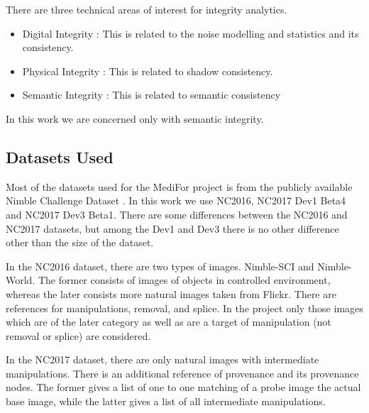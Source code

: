\documentclass{article}
\begin{document}
There are three technical areas of interest for integrity analytics. \cite{MedF_dw}
\newline
\begin{itemize}
\item Digital Integrity : This is related to the noise modelling and statistics and its consistency.
\item Physical Integrity : This is related to shadow consistency.
\item Semantic Integrity : This is related to semantic consistency
\end{itemize}

In this work we are concerned only with semantic integrity.

\subsection{Datasets Used}
Most of the datasets used for the MediFor project is from the publicly available Nimble Challenge Dataset \cite{Nimble}. In this work we use NC2016, NC2017 Dev1 Beta4 and NC2017 Dev3 Beta1. There are some differences between the NC2016 and NC2017 datasets, but among the Dev1 and Dev3 there is no other difference other than the size of the dataset.

In the NC2016 dataset, there are two types of images. Nimble-SCI and Nimble-World. The former consists of images of objects in controlled environment, whereas the later consists more natural images taken from Flickr. There are references for manipulations, removal, and splice. In the project only those images which are of the later category as well as are a target of manipulation (not removal or splice) are considered.

In the NC2017 dataset, there are only natural images with intermediate manipulations. There is an additional reference of provenance and its provenance nodes. The former gives a list of one to one matching of a probe image the actual base image, while the latter gives a list of all intermediate manipulations.


\end{document}
